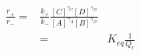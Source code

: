 \begin{eqnarray}
\frac{r_+}{r_-}  = &\frac{k_+}{k_-}\frac{[C]^{\gamma_C}[D]^{\gamma_D}}{[A]^{\gamma_A}[B]^{\gamma_D}} \\
 & = & K_{eq}\frac{1}{Q_r} \\
\end{eqnarray}
